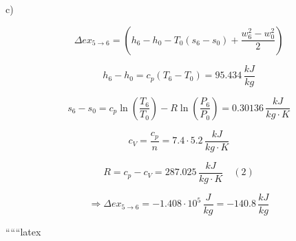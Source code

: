 c)

\[
\Delta ex_{5 \rightarrow 6} = (h_6 - h_0 - T_0 (s_6 - s_0) + \frac{w_6^2 - w_0^2}{2})
\]

\[
h_6 - h_0 = c_p (T_6 - T_0) = 95.434 \, \frac{kJ}{kg}
\]

\[
s_6 - s_0 = c_p \ln \left( \frac{T_6}{T_0} \right) - R \ln \left( \frac{P_6}{P_0} \right) = 0.30136 \, \frac{kJ}{kg \cdot K}
\]

\[
c_V = \frac{c_p}{n} = 7.4 \cdot 5.2 \, \frac{kJ}{kg \cdot K}
\]

\[
R = c_p - c_V = 287.025 \, \frac{kJ}{kg \cdot K} \quad (2)
\]

\[
\Rightarrow \Delta ex_{5 \rightarrow 6} = -1.408 \cdot 10^5 \, \frac{J}{kg} = -140.8 \, \frac{kJ}{kg}
\]

``````latex